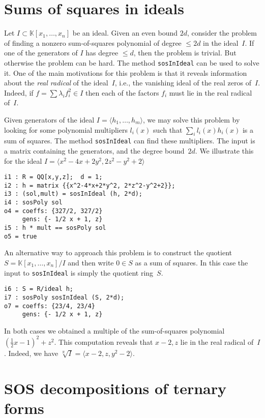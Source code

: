 \documentclass[11pt]{amsart}
\theoremstyle{plain}%
\theoremstyle{definition}
\theoremstyle{remark}
\newcommand{\RR}{\mathbb{R}}
\newcommand{\kk}{\mathbb{K}}
\begin{document}
\section{Sums of squares in ideals}
Let $I \subset \kk[x_{1},\dots,x_{n}]$ be an ideal.  
Given an even bound $2d$, consider the problem of finding a nonzero sum-of-squares polynomial of degree $\leq \!2d$ in the ideal~$I$.
If one of the generators of $I$ has degree $\leq \!d$, then the problem is trivial.
But otherwise the problem can be hard.
The method \verb|sosInIdeal| can be used to solve it.
One of the main motivations for this problem is that it reveals information about the \emph{real radical} of the ideal~$I$, 
i.e., the vanishing ideal of the real zeros of~$I$.
Indeed, if $f = \sum \lambda_i f_i^2 \in I$ then each of the factors $f_i$ must lie in the real radical of~$I$.

Given generators of the ideal $I=\langle h_1,\dots,h_m\rangle$, we may solve this problem by looking for some polynomial multipliers $l_i(x)$ such that  $\sum_i l_i(x) h_i(x)$ is a sum of squares.
The method \verb|sosInIdeal| can find these multipliers.
The input is a matrix containing the generators, and the degree bound~$2d$.
We illustrate this for the ideal 
$I=\langle x^2{-}4 x{+}2 y^2, 2 z^2{-}y^2{+}2 \rangle$
{\small
\begin{verbatim}
i1 : R = QQ[x,y,z];  d = 1;
i2 : h = matrix {{x^2-4*x+2*y^2, 2*z^2-y^2+2}};
i3 : (sol,mult) = sosInIdeal (h, 2*d);
i4 : sosPoly sol
o4 = coeffs: {327/2, 327/2}
     gens: {- 1/2 x + 1, z}
i5 : h * mult == sosPoly sol
o5 = true
\end{verbatim}
}
\noindent
An alternative way to approach this problem is to construct the quotient $S = \kk[x_{1},\dots,x_{n}]/I$ and then write $0\in S$ as a sum of squares.
In this case the input to \verb|sosInIdeal| is simply the quotient ring~$S$.
{\small
\begin{verbatim}
i6 : S = R/ideal h;
i7 : sosPoly sosInIdeal (S, 2*d);
o7 = coeffs: {23/4, 23/4}
     gens: {- 1/2 x + 1, z}
\end{verbatim}
}
\noindent
In both cases we obtained a multiple of the sum-of-squares polynomial $(\frac{1}{2}x{-}1)^2{+}z^2$.
This computation reveals that $x{-}2,z$ lie in the real radical of~$I$.
Indeed, we have $\sqrt[\RR]{I} = \langle x{-}2,z,y^2{-}2\rangle$.

\section{SOS decompositions of ternary forms}
\end{document}
